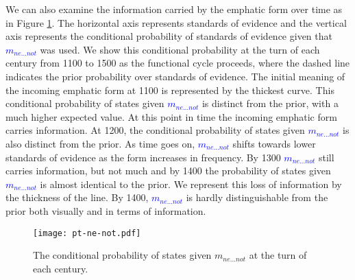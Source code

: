 \documentclass[linguex]{sp}
\theoremstyle{definition} \newtheorem{definition}{Definition}
\begin{document}
We can also examine the information carried by the emphatic form over time as in Figure \ref{m2-meaning}. The horizontal axis represents standards of evidence and the vertical axis represents the conditional probability of standards of evidence given that \emph{\textcolor{blue}{$m_{ne...not}$}} was used. We show this conditional probability at the turn of each century from 1100 to 1500 as the functional cycle proceeds, where the dashed line indicates the prior probability over standards of evidence.  The initial meaning of the incoming emphatic form at 1100 is represented by the thickest curve. This conditional probability of states given \emph{\textcolor{blue}{$m_{ne...not}$}} is distinct from the prior, with a much higher expected value. At this point in time the incoming emphatic form carries information. At 1200, the conditional probability of states given \emph{\textcolor{blue}{$m_{ne...not}$}} is also distinct from the prior. As time goes on, \emph{\textcolor{blue}{$m_{ne...not}$}}  shifts towards lower standards of evidence as the form increases in frequency.  By 1300 \emph{\textcolor{blue}{$m_{ne...not}$}} still carries information, but not much and by 1400 the probability of states given \emph{\textcolor{blue}{$m_{ne...not}$}} is almost identical to the prior. We represent this loss of information by the thickness of the line. By 1400, \emph{\textcolor{blue}{$m_{ne...not}$}} is hardly distinguishable from the prior both visually and in terms of information.

\begin{figure}
\centering
     \texttt{[image: pt-ne-not.pdf]}
\caption{The conditional probability of states given \textit{\color{blue} $m_{ne...not}$} at the turn of each century.}
\label{m2-meaning}
\end{figure}
\end{document}

